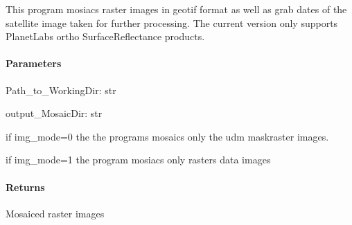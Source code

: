 \documentclass[letterpaper,10pt,english]{sphinxmanual}
\begin{document}
\begin{fulllineitems}
\label{\detokenize{akhdefo_functions:akhdefo_functions.Mosaic_Crop.Mosaic}}
\pysigstartsignatures
{}
\pysigstopsignatures
\sphinxAtStartPar
This program mosiacs raster images in geotif format as well as grab dates of the satellite image taken for further processing. 
The current version only supports PlanetLabs ortho SurfaceReflectance products.


\paragraph{Parameters}
\label{\detokenize{akhdefo_functions:id30}}
\sphinxAtStartPar
Path\_to\_WorkingDir: str

\sphinxAtStartPar
output\_MosaicDir: str
\begin{description}
\sphinxAtStartPar
if img\_mode=0 the the programs mosaics only the udm maskraster images.

\sphinxAtStartPar
if img\_mode=1 the program mosiacs only  rasters data images

\end{description}


\paragraph{Returns}
\label{\detokenize{akhdefo_functions:id31}}
\sphinxAtStartPar
Mosaiced raster images

\end{fulllineitems}

\end{document}
